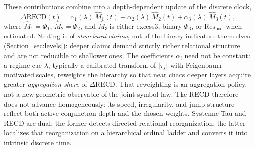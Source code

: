 \documentclass[11pt,a4paper]{article}
\begin{document}
These contributions combine into a depth-dependent update of the discrete
clock,
\begin{equation}
\label{eq:intro_drecd}
\Delta\mathrm{RECD}(t)
=\alpha_1(\lambda)\,\widehat{M}_1(t)
+\alpha_2(\lambda)\,\widehat{M}_2(t)
+\alpha_3(\lambda)\,\widehat{M}_3(t),
\end{equation}
where $\widehat{M}_1=\Phi_1$, $\widehat{M}_2=\Phi_2$, and
$\widehat{M}_3$ is either excess3, binary $\Phi_3$, or
$\mathrm{Res}_{\mathrm{pair}}$ when estimated. Nesting is of
\emph{structural claims}, not of the binary indicators themselves
(Section~\ref{sec:levels}): deeper claims demand strictly richer
relational structure and are not reducible to shallower ones. The
coefficients $\alpha_\ell$ need not be constant: a regime cue $\lambda$,
typically a calibrated transform of $|\tau_s|$ with Feigenbaum-motivated
scales, reweights the hierarchy so that near chaos deeper layers acquire
greater \emph{aggregation share} of $\Delta\mathrm{RECD}$. That
reweighting is an
aggregation policy, not a new geometric observable of the joint symbol
law. The RECD therefore does not advance homogeneously: its speed,
irregularity, and jump structure reflect both active conjunction depth
and the chosen weights. Systemic Tau and RECD are dual: the former
detects directed relational reorganization; the latter localizes that
reorganization on a hierarchical ordinal ladder and converts it into
intrinsic discrete time.
\end{document}
